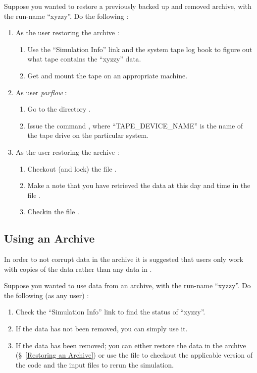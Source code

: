 Suppose you wanted to restore a previously backed up and removed
archive, with the run-name ``xyzzy''.  Do the following :
\begin{enumerate}
\item As the user restoring the archive :
      \begin{enumerate}
      \item Use the ``Simulation Info'' link and the system tape log
            book to figure out what tape contains the ``xyzzy'' data.
      \item Get and mount the tape on an appropriate machine.
      \end{enumerate}
\item As user {\it parflow} :
      \begin{enumerate}
      \item Go to the directory .
      \item Issue the command ,
            where ``TAPE\_DEVICE\_NAME'' is the name of the tape drive on
            the particular system.
      \end{enumerate}
\item As the user restoring the archive :
      \begin{enumerate}
      \item Checkout (and lock) the file .
      \item Make a note that you have retrieved the data at this day
            and time in the file .
      \item Checkin the file .
      \end{enumerate}
\end{enumerate}


\subsection{Using an Archive}
\label{Using an Archive}

In order to not corrupt data in the archive it is suggested that
users only work with copies of the data rather than any data in
.

Suppose you wanted to use data from an archive, with the run-name ``xyzzy''.
Do the following (as any user) :
\begin{enumerate}
\item Check the ``Simulation Info'' link to find the status of ``xyzzy''.
\item If the data has not been removed, you can simply use it.
\item If the data has been removed; you can either restore the data in
      the archive (\S~\ref{Restoring an Archive}) or use the 
      file to checkout the applicable version of the code and the input
      files to rerun the simulation.
\end{enumerate}
